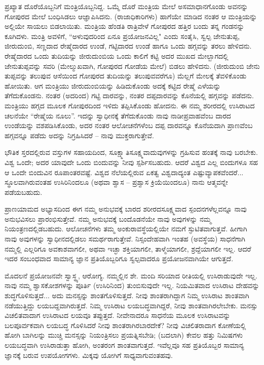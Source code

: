 ಪ್ರಖ್ಯಾತ ದೊರೆಯೊಬ್ಬನಿಗೆ ಮಂತ್ರಿಯೊಬ್ಬನಿದ್ದ. ಒಮ್ಮೆ ದೊರೆ ಮಂತ್ರಿಯ ಮೇಲೆ ಅಸಮಾಧಾನಗೊಂಡು ಅವನನ್ನು ಗೋಪುರದ ಮೇಲೆ ಬಂಧಿಸಿಡಲು ಆಜ್ಞಾಪಿಸಿದನು. (ರಾಜಾಧಿಕಾರಿಗಳು) ಹಾಗೆಯೇ ಮಾಡಿದ ನಂತರ ಆ ಮಂತ್ರಿಯನ್ನು ಅಲ್ಲಿಯೇ ಸಾಯಲು ಬಿಡಲಾಯಿತು. ಮಂತ್ರಿಯ ಹೆಂಡತಿ ರಾತ್ರಿವೇಳೆ ಗೋಪುರದ ಹತ್ತಿರ ಬಂದು ತನ್ನ ಗಂಡನನ್ನು ಕೂಗಿದಳು. ಮಂತ್ರಿ ಅವಳಿಗೆ, “ಅಳುವುದರಿಂದ ಏನೂ ಪ್ರಯೋಜನವಿಲ್ಲ" ಎಂದು ಸಂತೈಸಿ, ಸ್ವಲ್ಪ ಜೇನುತುಪ್ಪ, ಜೀರುದುಂಬಿ, ಸಣ್ಣದಾದ ರೇಷ್ಮೆದಾರದ ಉಂಡೆ, ಗಟ್ಟಿದಾರದ ಉಂಡೆ ಹಾಗೂ ಒಂದು ಹಗ್ಗವನ್ನು ತರಲು ಹೇಳಿದನು. ರೇಷ್ಮೆದಾರದ ಒಂದು ತುದಿಯನ್ನು ಜೀರುದುಂಬಿಯ ಒಂದು ಕಾಲಿಗೆ ಕಟ್ಟಿ ಅದರ ಮುಖದ ಮೇಲ್ಬಾಗದಲ್ಲಿ ಜೇನುತುಪ್ಪವನ್ನು ಸವರಿ (ಮೇಲ್ಮುಖವಾಗಿ, ಗೋಪುರದ ಗೋಡೆಯ ಮೇಲೆ) ಬಿಡಲು ಹೇಳಿದನು. (ಜೀರುದುಂಬಿ ಜೇನು ತುಪ್ಪವನ್ನು ತಲುಪುವ ಆಸೆಯಿಂದ ಗೋಪುರದ ತುದಿಯನ್ನು ತಲುಪುವವರೆಗೂ) ಮೆಲ್ಲಗೆ ಮೇಲಕ್ಕೆ ತೆವಳಿಕೊಂಡು ಹೋಯಿತು. ಆಗ ಮಂತ್ರಿಯು ಜೀರುದುಂಬಿಯನ್ನು ಹಿಡಿದುಕೊಂಡು ಅದಕ್ಕೆ ಕಟ್ಟಿದ ರೇಷ್ಮೆ ಎಳೆಯನ್ನು ತೆಗೆದುಕೊಂಡನು. ನಂತರ (ಅದರಿಂದ) ಗಟ್ಟಿ ದಾರವನ್ನು, ನಂತರ ದಪ್ಪದಾರವನ್ನು ಕೊನೆಯಲ್ಲಿ ಹಗ್ಗವನ್ನು ಪಡೆದನು. ಮಂತ್ರಿಯು ಹಗ್ಗದ ಮೂಲಕ ಗೋಪುರದಿಂದ ಇಳಿದು ತಪ್ಪಿಸಿಕೊಂಡು ಹೋದನು. ಈ ನಮ್ಮ ಶರೀರದಲ್ಲಿ ಉಸಿರಾಟದ ಚಲನೆಯೇ “ರೇಷ್ಮೆಯ ನೂಲು”. ಇದನ್ನು ಸ್ವಾಧೀನಕ್ಕೆ ತೆಗೆದುಕೊಂಡು ನಾವು ನಾಡೀಪ್ರವಾಹವೆಂಬ ದಾರದ ಉಂಡೆಯನ್ನು ವಶಪಡಿಸಿಕೊಂಡು, ಅದರ ನಂತರ ಆಲೋಚನೆಗಳೆಂಬ ದಪ್ಪ ದಾರವನ್ನೂ ಕೊನೆಯದಾಗಿ ಪ್ರಾಣವೆಂಬ ಹಗ್ಗವನ್ನೂ ಪಡೆದು ಅದನ್ನು ನಿಗ್ರಹಿಸಿದರೆ – ನಾವು ಮುಕ್ತರಾಗುತ್ತೇವೆ.

\vskip 6pt

ಭೌತಿಕ ಸ್ತರದಲ್ಲಿರುವ ವಸ್ತುಗಳ ಸಹಾಯದಿಂದ, ಸೂಕ್ಷ್ಮಾತಿಸೂಕ್ಷ್ಮವಾದುವುಗಳನ್ನು ಗ್ರಹಿಸುವ ಹಂತಕ್ಕೆ ನಾವು ಬರಬೇಕು. ವಿಶ್ವ ಒಂದೇ; ಅದರ ಯಾವುದೇ ಒಂದು ಬಿಂದುವನ್ನು ನೀವು ಸ್ಪರ್ಶಿಸಬಹುದು. ಆದರೆ ವಿಶ್ವದ ಎಲ್ಲ ಬಿಂದುಗಳೂ ಸಹ ಆ ಒಂದೇ ಬಿಂದುವಿನ ರೂಪಾಂತರವಷ್ಟೆ. ವಿಶ್ವದ ನೆಲೆಯಲ್ಲಿರುವ ಏಕತ್ವ ವಿಶ್ವದಾದ್ಯಂತ ಎಷ್ಟು\break ವ್ಯಾಪಕವೆಂದರೆ... ಸ್ಥೂಲವಾಗಿರುವಂತಹ ಉಸಿರಿನಿಂದಲೂ (ಅಥವಾ ಶ್ವಾಸ – ಪ್ರಶ್ವಾಸ ಕ್ರಿಯೆಯಿಂದಲೂ) ನಾನು ಆತ್ಮವನ್ನೇ ಪಡೆಯಬಹುದು.

\vskip 6pt

ಪ್ರಾಣಯಾಮದ ಅಭ್ಯಾಸದಿಂದ ಈಗ ನಮ್ಮ ಅನುಭವಕ್ಕೆ ಬಾರದ ಶರೀರದ\break ಸೂಕ್ಷ್ಮವಾದ ಸ್ಪಂದನಗಳೆಲ್ಲವನ್ನೂ ನಾವು ಅನುಭವಿಸಲು ಪ್ರಾರಂಭಿಸುತ್ತೇವೆ. ನಮ್ಮ ಅನುಭವಕ್ಕೆ ಬಂದೊಡನೆಯೇ ನಾವು ಅವುಗಳನ್ನು ನಮ್ಮ ನಿಯಂತ್ರಣದಲ್ಲಿಡಬಹುದು. ಆಲೋಚನೆಗಳು ತಮ್ಮ ಅಂಕುರಾವಸ್ಥೆಯಲ್ಲಿಯೇ ನಮಗೆ ಸ್ಫುಟಿತವಾಗುತ್ತವೆ. ಹೀಗಾಗಿ ನಾವು ಅವುಗಳನ್ನು ಸ್ವಾಧೀನದಲ್ಲಿಡಲು ಸಮರ್ಥರಾಗುತ್ತೇವೆ. ನಿಸ್ಸಂದೇಹವಾಗಿ ಇಂತಹ (ಅವಸ್ಥೆಯ) ಸಾಧನೆಗಾಗಿ ನಮ್ಮಲ್ಲಿ ಎಲ್ಲರಿಗೂ ಅವಕಾಶವಾಗಲೀ, ಅಥವಾ ಇಚ್ಛಾ ಶಕ್ತಿಯಾಗಲೀ, ತಾಳ್ಮೆಯಾಗಲೀ, ಶ್ರದ್ದೆಯಾಗಲೀ ಇಲ್ಲ. ಆದರೆ ಇದರ ಸಂಬಂಧವಾದ ಸಾಮಾನ್ಯ ಜ್ಞಾನ ಪ್ರತಿಯೊಬ್ಬರಿಗೂ ಸ್ವಲ್ಪವಾದರೂ ಪ್ರಯೋಜನವಾಗಿಯೇ ಆಗುತ್ತದೆ.

\vskip 6pt

ಮೊದಲನೆ ಪ್ರಯೋಜನವೇ ಸ್ವಾಸ್ಥ್ಯ, ಆರೋಗ್ಯ. ನಮ್ಮಲ್ಲಿನ ಶೇ. ಮಂದಿ ಸರಿಯಾದ ರೀತಿಯಲ್ಲಿ ಉಸಿರಾಡುವುದೇ ಇಲ್ಲ. ನಾವು ನಮ್ಮ ಶ್ವಾಸಕೋಶಗಳನ್ನು ಪೂರ್ತಿ (ಉಸಿರಿನಿಂದ) ತುಂಬಿಸುವುದೇ ಇಲ್ಲ. ನಿಯಮಿತವಾದ ಉಸಿರಾಟ ದೇಹವನ್ನು ಶುದ್ಧಗೊಳಿಸುತ್ತದೆ... ಅದು ಮನಸ್ಸನ್ನು ಶಾಂತಗೊಳಿಸುತ್ತದೆ. ನೀವು ಶಾಂತರಾಗಿದ್ದಾಗ ನಿಮ್ಮ ಉಸಿರಾಟ ಶಾಂತವಾಗಿ ನಡೆಯುತ್ತಿದ್ದು ಲಯಬದ್ದವಾಗಿರುತ್ತದೆ. ನಿಮ್ಮ ಉಸಿರಾಟ ಲಯಬದ್ಧವಾಗಿದ್ದರೆ, ನೀವು ಶಾಂತವಾಗಿರಲೇಬೇಕು. ಮನಸ್ಸು ವಿಚಲಿತವಾದಾಗ ಉಸಿರಾಟದ ಲಯವೂ ತಪ್ಪುತ್ತದೆ. ನೀವೇನಾದರೂ ಸಾಧನೆಯ ಮೂಲಕ ಉಸಿರಾಟವನ್ನು ಬಲಪೂರ್ವಕವಾಗಿ ಲಯಬದ್ಧ ಗೊಳಿಸಿದರೆ ನೀವು ಶಾಂತರಾಗಿರಬಾರದೇಕೆ? ನೀವು ವಿಚಲಿತರಾದಾಗ ಕೋಣೆಯಲ್ಲಿ ಹೋಗಿ ಬಾಗಿಲನ್ನು ಮುಚ್ಚಿ ಮನಸ್ಸನ್ನು ನಿಯಂತ್ರಿಸಲು ಪ್ರಯತ್ನಿಸಬೇಡಿ; (ಬದಲಾಗಿ) ಕೇವಲ ಹತ್ತು ನಿಮಿಷಗಳು ಲಯಬದ್ಧವಾಗಿ ಉಸಿರಾಡುತ್ತಾ ಹೋಗಿ, ಅಂತರಂಗ ಶಾಂತವಾಗುತ್ತದೆ. ಇವೆಲ್ಲವೂ ಸಹ ಪ್ರತಿಯೊಬ್ಬರ ಸಾಮಾನ್ಯ ಜ್ಞಾನಕ್ಕೆ ಬರುವ ಉಪಯೋಗಗಳು. ಮಿಕ್ಕವು ಯೋಗಿಗೆ ಸಾಧ್ಯವಾಗುವಂತಹವು.

